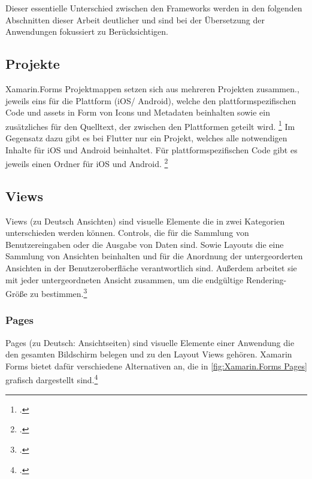 Dieser essentielle Unterschied zwischen den Frameworks werden in den folgenden Abschnitten dieser Arbeit deutlicher und sind bei der Übersetzung der Anwendungen fokussiert zu Berücksichtigen. 
\subsection{Projekte}
Xamarin.Forms Projektmappen setzen sich aus mehreren Projekten zusammen., jeweils eins für die Plattform (iOS/ Android),  welche den plattformspezifischen Code und assets in Form von Icons und Metadaten beinhalten sowie ein zusätzliches für den Quelltext,  der zwischen den Plattformen geteilt wird.  \footcite[Vgl.][S. 25f.]{Petzold2016} Im Gegensatz dazu gibt es bei Flutter nur ein Projekt, welches alle notwendigen Inhalte für iOS und Android beinhaltet.  Für plattformspezifischen Code gibt es jeweils einen Ordner für iOS und Android. \footcite[Vgl.][S. 113]{Biessek2019}

\subsection{Views}
Views (zu Deutsch Ansichten) sind visuelle Elemente die in zwei Kategorien unterschieden werden können.  Controls, die für die Sammlung von Benutzereingaben oder die Ausgabe von Daten sind.  Sowie Layouts die eine Sammlung von Ansichten beinhalten und für die Anordnung der untergeorderten Ansichten in der Benutzeroberfläche verantwortlich sind.  Außerdem arbeitet sie mit jeder untergeordneten Ansicht zusammen, um die endgültige Rendering-Größe zu bestimmen.\footcite[Vgl.][Abgerufen am \today]{Ritscher2020}
\subsubsection{Pages}
Pages (zu Deutsch: Ansichtseiten) sind visuelle Elemente einer Anwendung die den gesamten Bildschirm belegen und zu den Layout Views gehören.  Xamarin Forms bietet dafür 
verschiedene Alternativen an,  die in \ref{fig:Xamarin.Forms Pages} grafisch dargestellt sind.\footcite[Vgl.][Abgerufen am \today]{MicrosoftXamPages2016}

